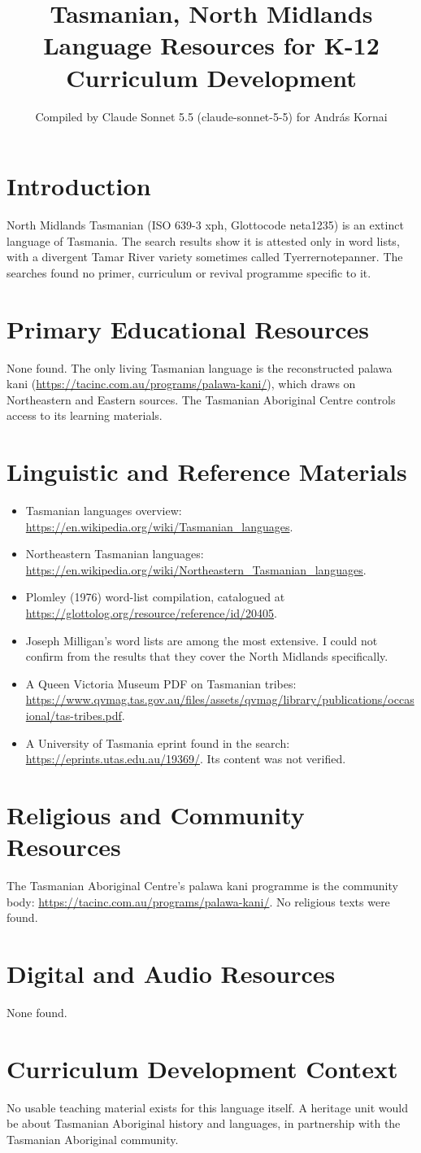 \documentclass[12pt]{article}
\title{Tasmanian, North Midlands Language Resources for K-12 Curriculum Development}
\author{Compiled by Claude Sonnet 5.5 (claude-sonnet-5-5) for Andr\'as Kornai}
\date{}
\begin{document}
\maketitle

\section{Introduction}
North Midlands Tasmanian (ISO 639-3 xph, Glottocode neta1235) is an extinct language of Tasmania. The search results show it is attested only in word lists, with a divergent Tamar River variety sometimes called Tyerrernotepanner. The searches found no primer, curriculum or revival programme specific to it.

\section{Primary Educational Resources}
None found. The only living Tasmanian language is the reconstructed palawa kani (\url{https://tacinc.com.au/programs/palawa-kani/}), which draws on Northeastern and Eastern sources. The Tasmanian Aboriginal Centre controls access to its learning materials.

\section{Linguistic and Reference Materials}
\begin{itemize}
\item Tasmanian languages overview: \url{https://en.wikipedia.org/wiki/Tasmanian_languages}.
\item Northeastern Tasmanian languages: \url{https://en.wikipedia.org/wiki/Northeastern_Tasmanian_languages}.
\item Plomley (1976) word-list compilation, catalogued at \url{https://glottolog.org/resource/reference/id/20405}.
\item Joseph Milligan's word lists are among the most extensive. I could not confirm from the results that they cover the North Midlands specifically.
\item A Queen Victoria Museum PDF on Tasmanian tribes: \url{https://www.qvmag.tas.gov.au/files/assets/qvmag/library/publications/occasional/tas-tribes.pdf}.
\item A University of Tasmania eprint found in the search: \url{https://eprints.utas.edu.au/19369/}. Its content was not verified.
\end{itemize}

\section{Religious and Community Resources}
The Tasmanian Aboriginal Centre's palawa kani programme is the community body: \url{https://tacinc.com.au/programs/palawa-kani/}. No religious texts were found.

\section{Digital and Audio Resources}
None found.

\section{Curriculum Development Context}
No usable teaching material exists for this language itself. A heritage unit would be about Tasmanian Aboriginal history and languages, in partnership with the Tasmanian Aboriginal community.
\end{document}
